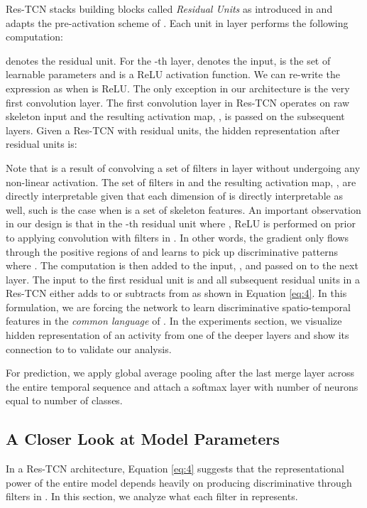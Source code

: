 \documentclass[10pt,twocolumn,letterpaper]{article}
\begin{document}
Res-TCN stacks building blocks called \textit{Residual Units} as introduced in \cite{resnet1} and adapts the pre-activation scheme of \cite{resnet}. Each unit in layer  performs the following computation:





 denotes the residual unit. For the -th layer,  denotes the input,  is the set of learnable parameters and  is a ReLU activation function. We can re-write the expression  as  when  is ReLU. The only exception in our architecture is the very first convolution layer. The first convolution layer in Res-TCN operates on raw skeleton input and the resulting activation map, , is passed on the subsequent layers. Given a Res-TCN with  residual units, the hidden representation after  residual units is:





Note that  is a result of convolving a set of filters in layer  without undergoing any non-linear activation. The set of filters in  and the resulting activation map, , are directly interpretable given that each dimension of  is directly interpretable as well, such is the case when  is a set of skeleton features. An important observation in our design is that in the -th residual unit where , ReLU is performed on  prior to applying convolution with filters in . In other words, the gradient only flows through the positive regions of  and  learns to pick up discriminative patterns where . The computation  is then added to the input, , and passed on to the next layer. The input to the first residual unit is  and all subsequent residual units in a Res-TCN either adds to or subtracts from  as shown in Equation \ref{eq:4}. In this formulation, we are forcing the network to learn discriminative spatio-temporal features in the \textit{common language} of . In the experiments section, we visualize hidden representation of an activity from one of the deeper layers and show its connection to  to validate our analysis.

For prediction, we apply global average pooling after the last merge layer across the entire temporal sequence and attach a softmax layer with number of neurons equal to number of classes.   



\subsection{A Closer Look at Model Parameters}
\label{section:closer}
In a Res-TCN architecture, Equation \ref{eq:4} suggests that the representational power of the entire model depends heavily on producing discriminative  through filters in . In this section, we analyze what each filter in  represents. 
\end{document}
